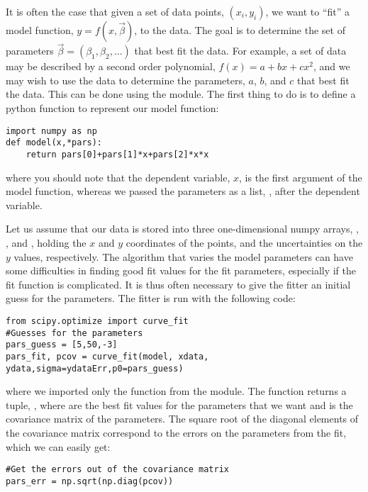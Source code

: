 It is often the case that given a set of data points, $(x_i,y_i)$, we want to ``fit'' a model function, $y=f(x,\vec\beta)$, to the data. The goal is to determine the set of parameters $\vec\beta=(\beta_1, \beta_2,\dots)$ that best fit the data. For example, a set of data may be described by a second order polynomial, $f(x)=a+bx+cx^2$, and we may wish to use the data to determine the parameters, $a$, $b$, and $c$ that best fit the data. This can be done using the  module. The first thing to do is to define a python function to represent our model function:
\begin{lstlisting}[frame=single] 
import numpy as np
def model(x,*pars):
    return pars[0]+pars[1]*x+pars[2]*x*x
\end{lstlisting}
where you should note that the dependent variable, $x$, is the first argument of the model function, whereas we passed the parameters as a list, , after the dependent variable.

Let us assume that our data is stored into three one-dimensional numpy arrays, , , and , holding the $x$ and $y$ coordinates of the points, and the uncertainties on the $y$ values, respectively. The algorithm that varies the model parameters can have some difficulties in finding good fit values for the fit parameters, especially if the fit function is complicated. It is thus often necessary to give the fitter an initial guess for the parameters. The fitter is run with the following code:

\begin{lstlisting}[frame=single] 
from scipy.optimize import curve_fit
#Guesses for the parameters
pars_guess = [5,50,-3]
pars_fit, pcov = curve_fit(model, xdata, ydata,sigma=ydataErr,p0=pars_guess)
\end{lstlisting}
where we imported only the  function from the  module. The  function returns a tuple, , where  are the best fit values for the parameters that we want and  is the covariance matrix of the parameters. The square root of the diagonal elements of the covariance matrix correspond to the errors on the parameters from the fit, which we can easily get:
\begin{lstlisting}[frame=single] 
#Get the errors out of the covariance matrix
pars_err = np.sqrt(np.diag(pcov))
\end{lstlisting}

